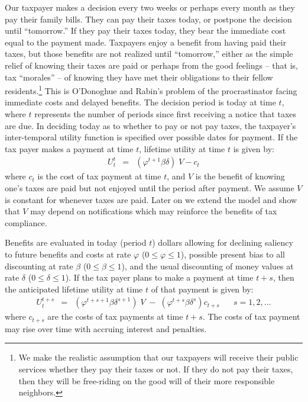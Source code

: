 \documentclass[12pt]{article}
\begin{document}
Our taxpayer makes a decision every two weeks or perhaps every month
as they pay their family bills.  They can pay their taxes today, or
postpone the decision until ``tomorrow.''  If they pay their taxes
today, they bear the immediate cost equal to the payment made.
Taxpayers enjoy a benefit from having paid their taxes, but those
benefits are not realized until ``tomorrow,'' either as the simple
relief of knowing their taxes are paid or perhaps from the good
feelings -- that is, tax ``morales'' -- of knowing they have met their
obligations to their fellow residents.\footnote{ We make the realistic
  assumption that our taxpayers will receive their public services
  whether they pay their taxes or not.  If they do not pay their
  taxes, then they will be free-riding on the good will of their more
  responsible neighbors.  }  This is O'Donoghue and Rabin's problem of
the procrastinator facing immediate costs and delayed benefits. The
decision period is today at time $t$, where $t$ represents the number
of periods since first receiving a notice that taxes are due.  In
deciding today as to whether to pay or not pay taxes, the taxpayer's
inter-temporal utility function is specified over possible dates for
payment. If the tax payer makes a payment at time $t$, lifetime
utility at time $t$ is given by:
\begin{eqnarray}\label{eq1}
U_t^t  &=& (\varphi^{t+1} \beta \delta) \;  V - c_ t 
\end{eqnarray}
where $c_t$ is the cost of tax payment at time $t$, and $V$ is the
benefit of knowing one's taxes are paid but not enjoyed until the
period after payment.  We assume $V$ is constant for whenever taxes
are paid. Later on we extend the model and show that $V$ may depend on
notifications which may reinforce the benefits of tax compliance.

Benefits are evaluated in today (period $t$) dollars allowing for
declining saliency to future benefits and costs at rate $\varphi$ ($0
\le \varphi \le 1$), possible present bias to all discounting at rate
$\beta$ ($0 \le \beta \le 1$), and the usual discounting of money
values at rate $\delta$ ($0 \le \delta\le 1$).  If the tax payer plans
to make a payment at time $t + s$, then the anticipated lifetime
utility at time $t$ of that payment is given by:
\begin{eqnarray}\label{eq2}
U_t^{t+s} &=& (\varphi^{t+s+1} \beta \delta^{s+1}) \; V \; - \; (\varphi^{t+s}
\beta \delta^{s}) c_ {t+s} \; \; \; \; \; \; s=1,2, ...
\end{eqnarray}
where $c_{t+s}$ are the costs of tax payments at time $t+s$. The costs
of tax payment may rise over time with accruing interest and
penalties.
\end{document}
